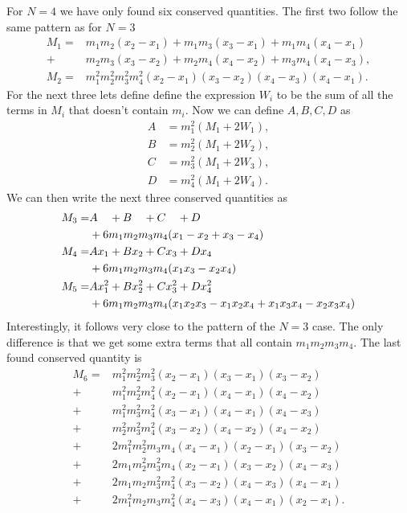 \documentclass[english,master]{liumaiex}
\theoremstyle{plain}
\theoremstyle{definition}
\begin{document}
For $N = 4$ we have only found six conserved quantities. The first two follow the same pattern as for $N = 3$
\begin{align}
	M_1 = &m_1 m_2 (x_2 - x_1) + m_1 m_3 (x_3 - x_1) + m_1 m_4 (x_4 - x_1) \\ +  &m_2 m_3 (x_3 - x_2) + m_2 m_4 (x_4 - x_2) + m_3 m_4 (x_4 - x_3),\\
	M_2 = &m_1^2m_2^2m_3^2m_4^2(x_2 - x_1)(x_3 - x_2)(x_4 - x_3)(x_4 - x_1).
\end{align}
For the next three lets define define the expression $W_i$ to be the sum of all the terms in $M_i$ that doesn't contain $m_i$. Now we can define $A, B, C, D$ as
\begin{align}
	A &= m_1^2(M_1 + 2W_1), \\
	B &= m_2^2(M_1 + 2W_2), \\
	C &= m_3^2(M_1 + 2W_3), \\
	D &= m_4^2(M_1 + 2W_4).
\end{align}
We can then write the next three conserved quantities as
\begin{align}
	M_3 =& A\phantom{x_1} + B\phantom{x_2} + C\phantom{x_3} + D\phantom{x_4} \notag \\
	&+ 6m_1m_2m_3m_4 (x_1 - x_2 + x_3 - x_4) \\
	M_4 =& Ax_1 + Bx_2 + Cx_3 + Dx_4 \notag \\
	&+ 6m_1m_2m_3m_4 (x_1x_3 - x_2x_4) \\
	M_5 =& Ax_1^2 + Bx_2^2 + Cx_3^2 + Dx_4^2 \notag \\
	&+ 6m_1m_2m_3m_4 (x_1x_2x_3 - x_1x_2x_4 + x_1x_3x_4 - x_2x_3x_4)
\end{align}
%
Interestingly, it follows very close to the pattern of the $N = 3$ case. The only difference is that we get some extra terms that all contain $m_1m_2m_3m_4$. The last found conserved quantity is
\begin{equation}
\begin{aligned}
	M_6 =
		 &m_1^2m_2^2m_3^2(x_2 - x_1)(x_3 - x_1)(x_3 - x_2) \\
		+&m_1^2m_2^2m_4^2(x_2 - x_1)(x_4 - x_1)(x_4 - x_2) \\
		+&m_1^2m_3^2m_4^2(x_3 - x_1)(x_4 - x_1)(x_4 - x_3) \\
		+&m_2^2m_3^2m_4^2(x_3 - x_2)(x_4 - x_2)(x_4 - x_2) \\
		+&2m_1^2m_2^2m_3m_4(x_4 - x_1)(x_2 - x_1)(x_3 - x_2) \\
		+&2m_1m_2^2m_3^2m_4(x_2 - x_1)(x_3 - x_2)(x_4 - x_3) \\
		+&2m_1m_2m_3^2m_4^2(x_3 - x_2)(x_4 - x_3)(x_4 - x_1) \\
		+&2m_1^2m_2m_3m_4^2(x_4 - x_3)(x_4 - x_1)(x_2 - x_1).
\end{aligned}
\end{equation}
\end{document}
